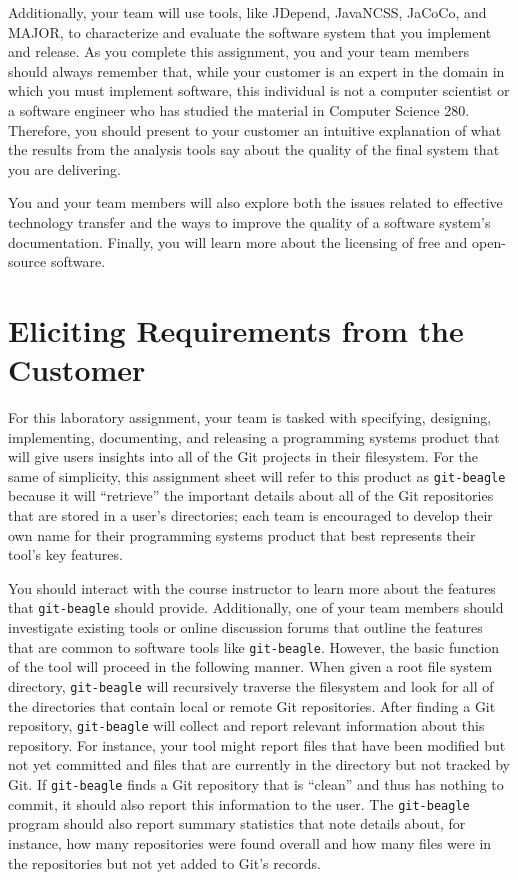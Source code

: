 Additionally, your team will use tools, like JDepend, JavaNCSS, JaCoCo, and MAJOR, to characterize and evaluate the
software system that you implement and release.  As you complete this assignment, you and your team members should
always remember that, while your customer is an expert in the domain in which you must implement software, this
individual is not a computer scientist or a software engineer who has studied the material in Computer Science 280.
Therefore, you should present to your customer an intuitive explanation of what the results from the analysis tools say
about the quality of the final system that you are delivering.

You and your team members will also explore both the issues related to effective technology transfer
and the ways to improve the quality of a software system's documentation. Finally, you will learn more about the
licensing of free and open-source software.




\section*{Eliciting Requirements from the Customer}

For this laboratory assignment, your team is tasked with specifying, designing, implementing, documenting, and releasing
a programming systems product that will give users insights into all of the Git projects in their filesystem. For the
same of simplicity, this assignment sheet will refer to this product as {\tt git-beagle} because it will ``retrieve''
the important details about all of the Git repositories that are stored in a user's directories; each team is encouraged
to develop their own name for their programming systems product that best represents their tool's key features.

You should interact with the course instructor to learn more about the features that {\tt git-beagle} should provide.
Additionally, one of your team members should investigate existing tools or online discussion forums that outline the
features that are common to software tools like {\tt git-beagle}. However, the basic function of the tool will proceed
in the following manner. When given a root file system directory, {\tt git-beagle} will recursively traverse the
filesystem and look for all of the directories that contain local or remote Git repositories. After finding a Git
repository, {\tt git-beagle} will collect and report relevant information about this repository. For instance, your tool
might report files that have been modified but not yet committed and files that are currently in the directory but
not tracked by Git. If {\tt git-beagle} finds a Git repository that is ``clean'' and thus has nothing to commit, it
should also report this information to the user. The {\tt git-beagle} program should also report summary statistics that
note details about, for instance, how many repositories were found overall and how many files were in the repositories
but not yet added to Git's records.

